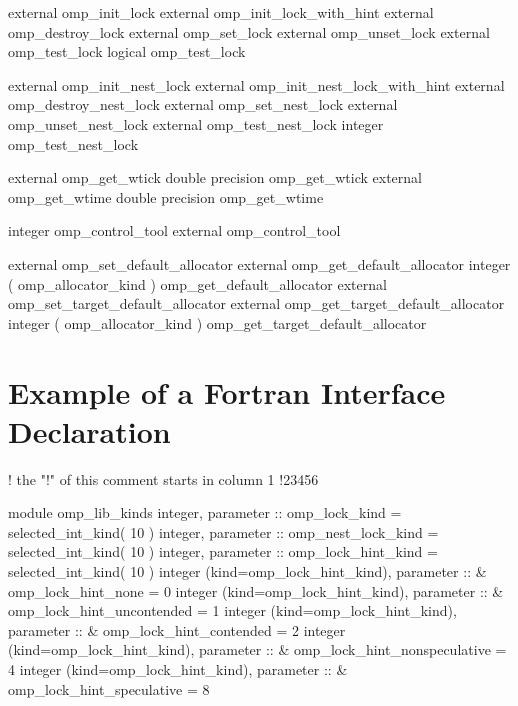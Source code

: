 {{\begin{codepar}
     external omp\_init\_lock
     external omp\_init\_lock\_with\_hint
     external omp\_destroy\_lock
     external omp\_set\_lock
     external omp\_unset\_lock
     external omp\_test\_lock
     logical omp\_test\_lock

     external omp\_init\_nest\_lock
     external omp\_init\_nest\_lock\_with\_hint
     external omp\_destroy\_nest\_lock
     external omp\_set\_nest\_lock
     external omp\_unset\_nest\_lock
     external omp\_test\_nest\_lock
     integer omp\_test\_nest\_lock

     external omp\_get\_wtick
     double precision omp\_get\_wtick
     external omp\_get\_wtime
     double precision omp\_get\_wtime

     integer  omp\_control\_tool
     external omp\_control\_tool

     external omp\_set\_default\_allocator
     external omp\_get\_default\_allocator
     integer ( omp\_allocator\_kind ) omp\_get\_default\_allocator
     external omp\_set\_target\_default\_allocator
     external omp\_get\_target\_default\_allocator
     integer ( omp\_allocator\_kind ) omp\_get\_target\_default\_allocator

\end{codepar}}





\pagebreak
\section{Example of a Fortran Interface Declaration }
\label{sec:Example of a Fortran Interface Declaration module}
{\small \begin{codepar}
!      the "!" of this comment starts in column 1
!23456

        module omp\_lib\_kinds
        integer, parameter :: omp\_lock\_kind = selected\_int\_kind( 10 )
        integer, parameter :: omp\_nest\_lock\_kind = selected\_int\_kind( 10 )
        integer, parameter :: omp\_lock\_hint\_kind = selected\_int\_kind( 10 )
        integer (kind=omp\_lock\_hint\_kind), parameter :: 
      \&   omp\_lock\_hint\_none = 0
        integer (kind=omp\_lock\_hint\_kind), parameter :: 
      \&   omp\_lock\_hint\_uncontended = 1
        integer (kind=omp\_lock\_hint\_kind), parameter :: 
      \&   omp\_lock\_hint\_contended = 2
        integer (kind=omp\_lock\_hint\_kind), parameter :: 
      \&   omp\_lock\_hint\_nonspeculative = 4 
        integer (kind=omp\_lock\_hint\_kind), parameter :: 
      \&   omp\_lock\_hint\_speculative = 8


\end{codepar}}}
